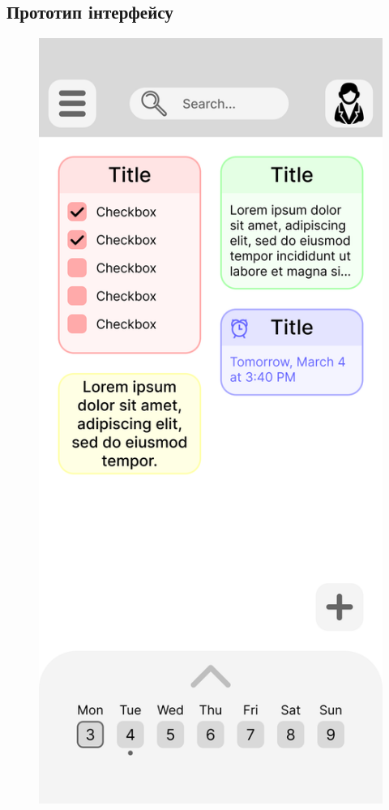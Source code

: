 \documentclass[oneside,14pt]{extarticle}
\begin{document}
\begin{normalsize}
	\subsection*{Прототип інтерфейсу}
	
	\begin{figure}[H]
		\begin{minipage}{0.48\textwidth}
			\centering
			\includegraphics[scale=0.12]{Frame 1}

\end{minipage}
\end{figure}
\end{normalsize}
\end{document}
